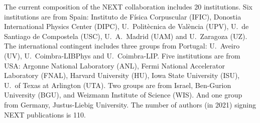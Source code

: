  

 


 
The current composition of the NEXT collaboration includes 20 institutions. Six institutions are from Spain:  Instituto de F\'isica Corpuscular (IFIC), Donostia International Physics Center (DIPC), U.~Polit\`ecnica de Val\`encia (UPV), U.~de Santiago de Compostela (USC), U.~A.~Madrid (UAM) and U.~Zaragoza (UZ). The international contingent includes three groups from Portugal: U.~Aveiro (UV), U.~Coimbra-LIBPhys and U.~Coimbra-LIP. Five institutions are from USA: Argonne National Laboratory (ANL), Fermi National Accelerator Laboratory (FNAL), Harvard University (HU), Iowa State University (ISU), U.~of Texas at Arlington (UTA). Two groups are from Israel, Ben-Gurion University (BGU), and Weizmann Institute of Science (WIS). And one group from Germany, Justus-Liebig University. The number of authors (in 2021) signing NEXT publications is 110. 

